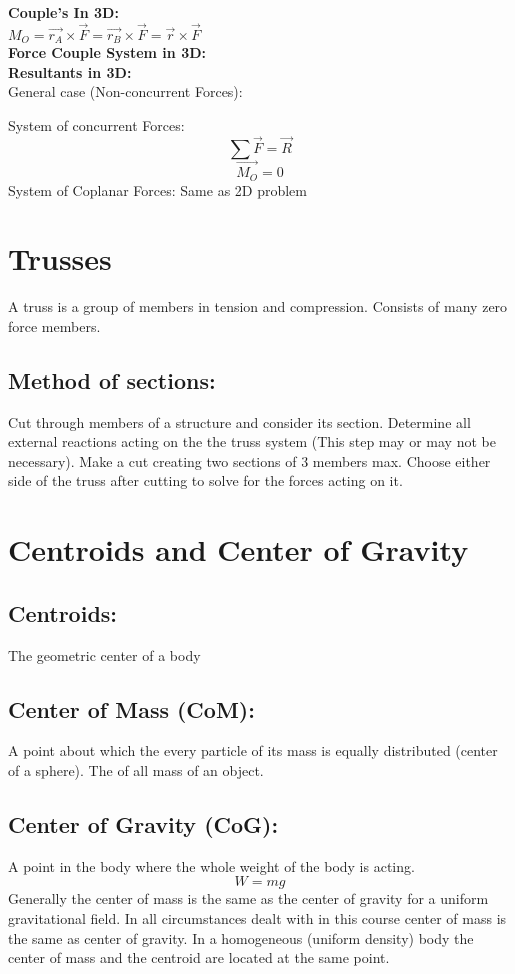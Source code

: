 \documentclass[14pt]{article}
\begin{document}
    \textbf{Couple's In 3D:}\\
    $M_O=\vec{r_A}\times\vec{F}=\vec{r_B}\times\vec{F}=\vec{r}\times\vec{F}$\\
    \textbf{Force Couple System in 3D:}\\
    \textbf{Resultants in 3D:}\\
    General case (Non-concurrent Forces): 
    
    System of concurrent Forces:
    $$\sum\vec{F}=\vec{R}$$$$\vec{M_O}=0$$
    System of Coplanar Forces: Same as 2D problem
    \section{Trusses}
    A truss is a group of members in tension and compression. Consists of many zero force members.
    \subsection{Method of sections:}
    Cut through members of a structure and consider its section. Determine all external reactions acting on the the truss system (This step may or may not be necessary).
    Make a cut creating two sections of 3 members max. Choose either side of the truss after cutting to solve for the forces acting on it.

    \section{Centroids and Center of Gravity}
    \subsection{Centroids:} The geometric center of a body
    \subsection{Center of Mass (CoM):} A point about which the every particle of its mass is equally distributed (center of a sphere).
    The  of all mass of an object.
    \subsection{Center of Gravity (CoG):} A point in the body where the whole weight of the body is acting. $$W=m g$$ Generally the center of mass is the same as the center of gravity for a uniform gravitational field. In all circumstances dealt with in this course center of mass is the same as center of gravity. 
    In a homogeneous (uniform density) body the center of mass and the centroid are located at the same point. 
\end{document}
